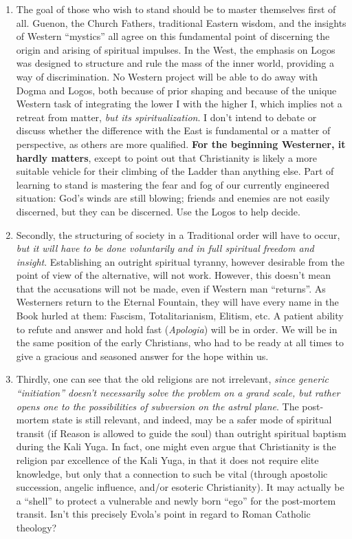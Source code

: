 \begin{enumerate}
\item The goal of those who wish to stand should be to master themselves first of all. Guenon, the Church Fathers, traditional Eastern wisdom, and the insights of Western ``mystics'' all agree on this fundamental point of discerning the origin and arising of spiritual impulses. In the West, the emphasis on Logos was designed to structure and rule the mass of the inner world, providing a way of discrimination. No Western project will be able to do away with Dogma and Logos, both because of prior shaping and because of the unique Western task of integrating the lower I with the higher I, which implies not a retreat from matter, \emph{but its spiritualization}. I don't intend to debate or discuss whether the difference with the East is fundamental or a matter of perspective, as others are more qualified. \textbf{For the beginning Westerner, it hardly matters}, except to point out that Christianity is likely a more suitable vehicle for their climbing of the Ladder than anything else. Part of learning to stand is mastering the fear and fog of our currently engineered situation: God's winds are still blowing; friends and enemies are not easily discerned, but they can be discerned. Use the Logos to help decide.

\item Secondly, the structuring of society in a Traditional order will have to occur, \emph{but it will have to be done voluntarily and in full spiritual freedom and insight}. Establishing an outright spiritual tyranny, however desirable from the point of view of the alternative, will not work. However, this doesn't mean that the accusations will not be made, even if Western man ``returns''. As Westerners return to the Eternal Fountain, they will have every name in the Book hurled at them: Fascism, Totalitarianism, Elitism, etc. A patient ability to refute and answer and hold fast (\emph{Apologia}) will be in order. We will be in the same position of the early Christians, who had to be ready at all times to give a gracious and seasoned answer for the hope within us.

\item Thirdly, one can see that the old religions are not irrelevant, \emph{since generic ``initiation'' doesn't necessarily solve the problem on a grand scale, but rather opens one to the possibilities of subversion on the astral plane}. The post-mortem state is still relevant, and indeed, may be a safer mode of spiritual transit (if Reason is allowed to guide the soul) than outright spiritual baptism during the Kali Yuga. In fact, one might even argue that Christianity is the religion par excellence of the Kali Yuga, in that it does not require elite knowledge, but only that a connection to such be vital (through apostolic succession, angelic influence, and/or esoteric Christianity). It may actually be a ``shell'' to protect a vulnerable and newly born ``ego'' for the post-mortem transit. Isn't this precisely Evola's point in regard to Roman Catholic theology?


\end{enumerate}
